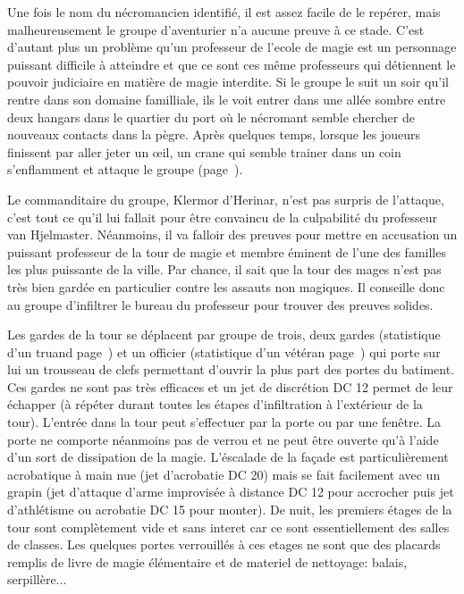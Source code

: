 Une fois le nom du nécromancien identifié, il est assez facile de le repérer, mais malheureusement le
groupe d'aventurier n'a aucune preuve à ce stade. C'est d'autant plus un problème qu'un professeur de
l'ecole de magie est un personnage puissant difficile à atteindre et que ce sont ces même professeurs
qui détiennent le pouvoir judiciaire en matière de magie interdite. Si le groupe le suit un soir qu'il
rentre dans son domaine familliale, ils le voit entrer dans une allée sombre entre deux hangars dans le 
quartier du port où le nécromant semble chercher de nouveaux contacts dans la pègre. Après quelques temps, 
lorsque les joueurs finissent par aller jeter un \oe{}il, un crane qui semble trainer dans un coin
s'enflamment et attaque le groupe (page~\pageref{CraneFlamboyant}).  

Le commanditaire du groupe, Klermor d'Herinar, n'est pas surpris de l'attaque, c'est tout ce qu'il
lui fallait pour être convaincu de la culpabilité du professeur van Hjelmaster. Néanmoins, il va falloir
des preuves pour mettre en accusation un puissant professeur de la tour de magie et membre éminent de
l'une des familles les plus puissante de la ville. Par chance, il sait que la tour des mages n'est pas 
très bien gardée en particulier contre les assauts non magiques. Il conseille donc au groupe d'infiltrer le
bureau du professeur pour trouver des preuves solides. 

Les gardes de la tour se déplacent par groupe de
trois, deux gardes (statistique d'un truand page~\pageref{Truand}) et un officier (statistique d'un
vétéran page~\pageref{Veteran}) qui porte sur lui un trousseau de clefs permettant d'ouvrir la plus part
des portes du batiment. Ces gardes ne sont pas très efficaces et un jet de discrétion DC 12
permet de leur échapper (à répéter durant toutes les étapes d'infiltration à l'extérieur de la tour). 
L'entrée dans la tour peut s'effectuer par la porte ou par une fenêtre. La porte ne comporte néanmoins 
pas de verrou et ne peut être ouverte qu'à l'aide d'un sort de dissipation de la magie. L'éscalade de la 
façade est particulièrement acrobatique à main nue (jet d'acrobatie DC 20) mais se fait facilement avec un
grapin (jet d'attaque d'arme improvisée à distance DC 12 pour accrocher puis jet d'athlétisme ou acrobatie 
DC 15 pour monter). De nuit, les premiers étages de la tour sont complètement vide et sans interet car
ce sont essentiellement des salles de classes. Les quelques portes verrouillés à ces etages ne sont que 
des placards remplis de livre de magie élémentaire et de materiel de nettoyage: balais, serpillère...

